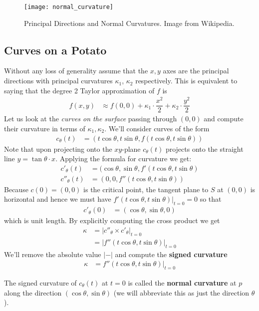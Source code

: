 \begin{figure}[H]
	\centering
	\texttt{[image: normal\_curvature]}
	\caption{Principal Directions and Normal Curvatures. Image from Wikipedia.}
\end{figure}

\subsection{Curves on a Potato}
Without any loss of generality assume that the $x, y$ axes are the principal directions with principal curvatures $\kappa_1$, $\kappa_2$ respectively. This is equivalent to saying that the degree 2 Taylor approximation of $ f$ is
\begin{align*}
	f(x,y) &\approx f(0,0) + \kappa_1 \cdot \dfrac{x^2}{2} + \kappa_2 \cdot \dfrac{y^2}{2}
\end{align*}
Let us look at the \emph{curves on the surface} passing through $(0,0)$ and compute their curvature in terms of $ \kappa_1, \kappa_2$. We'll consider curves of the form
\begin{align*}
	c_\theta(t)
	 & = (t \cos \theta, t \sin \theta, f(t\cos \theta,t\sin \theta))
\end{align*}
Note that upon projecting onto the $xy$-plane $c_\theta(t)$ projects onto the straight line $y=\tan \theta \cdot x$. Applying the formula for curvature we get:
\begin{align*}
	c'_\theta(t) &= (\cos \theta, \sin \theta, f'(t\cos \theta,t\sin \theta) \\
	c''_\theta(t) &= (0, 0, f''(t\cos \theta,t\sin \theta))
\end{align*}
Because $c(0)=(0,0)$ is the critical point, the tangent plane to $S$ at $(0,0)$ is horizontal and hence we must have $f'(t\cos \theta,t\sin \theta)|_{t=0}=0$ so that
\begin{align*}
	c'_\theta(0) &= (\cos \theta, \sin \theta, 0)
\end{align*}
which is unit length. By explicitly computing the cross product we get
\begin{align*}
	\kappa
	&= |c''_\theta \times c'_\theta|_{t=0} \\
	&= |f''(t\cos \theta,t\sin \theta)|_{t=0}
\end{align*}
We'll remove the absolute value $\lvert - \rvert$ and compute the \textbf{signed curvature}
\begin{align*}
	\kappa &= f''(t\cos \theta,t\sin \theta)|_{t=0}
\end{align*}
\begin{definition}
	\label{def:normal_curvature}
	The signed curvature of $c_\theta(t)$ at $t=0$ is called the \textbf{normal curvature} at $p$ along the direction $(\cos \theta, \sin \theta)$ (we will abbreviate this as just the direction $\theta$).
\end{definition}
